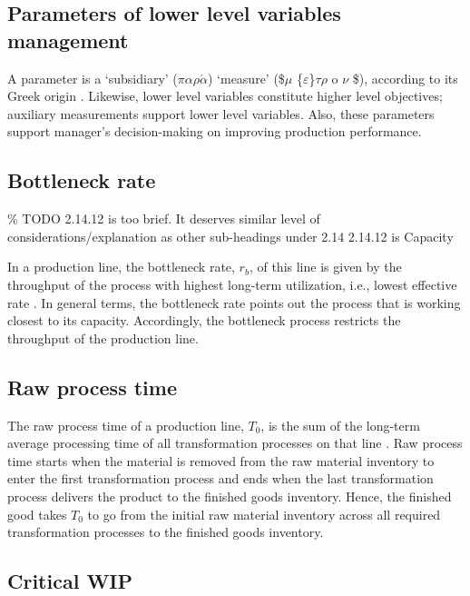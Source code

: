 \documentclass{article}
\begin{document}
\subsection{Parameters of lower level variables management}

A parameter is a `subsidiary' (\(\pi\alpha \rho\acute{\alpha}\)) `measure' (\$\(\mu\) \textasciiacute{}\{\(\varepsilon\)\}\(\tau \rho\) o \(\nu\) \$), according to its Greek origin \citep{LSJcontributors2013}.
Likewise, lower level variables constitute higher level objectives; auxiliary measurements support lower level variables.
Also, these parameters support manager's decision-making on improving production performance.

\subsection{Bottleneck rate}

\% TODO 2.14.12 is too brief. It deserves similar level of considerations/explanation as other sub-headings under 2.14 2.14.12 is Capacity


In a production line, the bottleneck rate, \(r_b\), of this line is given by the throughput of the process with highest long-term utilization, i.e., lowest effective rate \citep[p.218]{Hopp2001}.
In general terms, the bottleneck rate points out the process that is working closest to its capacity.
Accordingly, the bottleneck process restricts the throughput of the production line.

\subsection{Raw process time}

The raw process time of a production line, \(T_0\), is the sum of the long-term average processing time of all transformation processes on that line \citep{Hopp2001}.
Raw process time starts when the material is removed from the raw material inventory to enter the first transformation process and ends when the last transformation process delivers the product to the finished goods inventory.
Hence, the finished good takes \(T_0\) to go from the initial raw material inventory across all required transformation processes to the finished goods inventory.

\subsection{Critical WIP}
\end{document}

